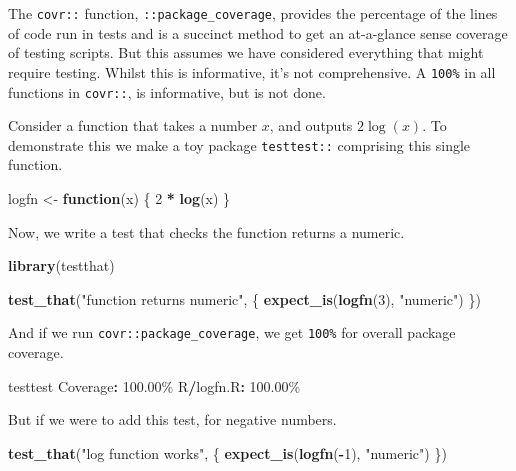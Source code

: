 \documentclass[
]{article}
\newenvironment{Shaded}{\begin{snugshade}}{\end{snugshade}}
\newcommand{\ControlFlowTok}[1]{\textcolor[rgb]{0.13,0.29,0.53}{\textbf{#1}}}
\newcommand{\DecValTok}[1]{\textcolor[rgb]{0.00,0.00,0.81}{#1}}
\newcommand{\FloatTok}[1]{\textcolor[rgb]{0.00,0.00,0.81}{#1}}
\newcommand{\KeywordTok}[1]{\textcolor[rgb]{0.13,0.29,0.53}{\textbf{#1}}}
\newcommand{\NormalTok}[1]{#1}
\newcommand{\OperatorTok}[1]{\textcolor[rgb]{0.81,0.36,0.00}{\textbf{#1}}}
\newcommand{\StringTok}[1]{\textcolor[rgb]{0.31,0.60,0.02}{#1}}
\begin{document}
The \texttt{covr::} function, \texttt{::package\_coverage}, provides the percentage of the lines of code run in tests and is a succinct method to get an at-a-glance sense coverage of testing scripts. But this assumes we have considered everything that might require testing. Whilst this is informative, it's not comprehensive. A \texttt{100\%} in all functions in \texttt{covr::}, is informative, but is not done.

Consider a function that takes a number \(x\), and outputs \(2\log(x)\). To demonstrate this we make a toy package \texttt{testtest::} comprising this single function.

\begin{Shaded}
\begin{Highlighting}[]
\NormalTok{logfn <{-}}\StringTok{ }\ControlFlowTok{function}\NormalTok{(x) \{}
  \DecValTok{2} \OperatorTok{*}\StringTok{ }\KeywordTok{log}\NormalTok{(x)}
\NormalTok{\}}
\end{Highlighting}
\end{Shaded}

Now, we write a test that checks the function returns a numeric.

\begin{Shaded}
\begin{Highlighting}[]
\KeywordTok{library}\NormalTok{(testthat)}

\KeywordTok{test\_that}\NormalTok{(}\StringTok{"function returns numeric"}\NormalTok{, \{}
  \KeywordTok{expect\_is}\NormalTok{(}\KeywordTok{logfn}\NormalTok{(}\DecValTok{3}\NormalTok{), }\StringTok{"numeric"}\NormalTok{)}
\NormalTok{\})}
\end{Highlighting}
\end{Shaded}

And if we run \texttt{covr::package\_coverage}, we get \texttt{100\%} for overall package coverage.

\begin{Shaded}
\begin{Highlighting}[]
\NormalTok{testtest Coverage}\OperatorTok{:}\StringTok{ }\FloatTok{100.00}\NormalTok{\%}
\NormalTok{R}\OperatorTok{/}\NormalTok{logfn.R}\OperatorTok{:}\StringTok{ }\FloatTok{100.00}\NormalTok{\%}
\end{Highlighting}
\end{Shaded}

But if we were to add this test, for negative numbers.

\begin{Shaded}
\begin{Highlighting}[]
\KeywordTok{test\_that}\NormalTok{(}\StringTok{"log function works"}\NormalTok{, \{}
  \KeywordTok{expect\_is}\NormalTok{(}\KeywordTok{logfn}\NormalTok{(}\OperatorTok{{-}}\DecValTok{1}\NormalTok{), }\StringTok{"numeric"}\NormalTok{)}
\NormalTok{\})}
\end{Highlighting}
\end{Shaded}
\end{document}
